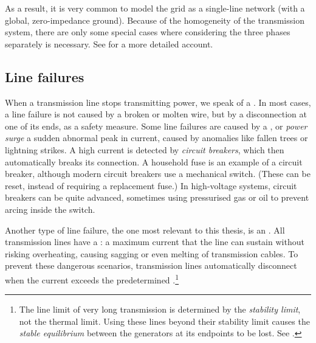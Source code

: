 \documentclass[main.tex]{subfiles}
\begin{document}
As a result, it is very common to model the grid as a single-line network (with a global, zero-impedance ground). Because of the homogeneity of the transmission system, there are only some special cases where considering the three phases separately is necessary. See \cite{Kirtley2010} for a more detailed account.

\subsection{Line failures}\label{sec:linefailures}
When a transmission line stops transmitting power, we speak of a . In most cases, a line failure is not caused by a broken or molten wire, but by a disconnection at one of its ends, as a safety measure. 
Some line failures are caused by a , or \emph{power surge} a sudden abnormal peak in current, caused by anomalies like fallen trees or lightning strikes. A high current is detected by \emph{circuit breakers}, which then automatically breaks its connection. A household fuse is an example of a circuit breaker, although modern circuit breakers use a mechanical switch. (These can be reset, instead of requiring a replacement fuse.) In high-voltage systems, circuit breakers can be quite advanced, sometimes using pressurised gas or oil to prevent arcing inside the switch.

Another type of line failure, the one most relevant to this thesis, is an . All transmission lines have a : a maximum current that the line can sustain without risking overheating, causing sagging or even melting of transmission cables. To prevent these dangerous scenarios, transmission lines automatically disconnect when the current exceeds the predetermined .\footnote{The line limit of very long transmission is determined by the \emph{stability limit}, not the thermal limit. Using these lines beyond their stability limit causes the \emph{stable equilibrium} between the generators at its endpoints to be lost. See \cite{VonMeier2006}.}
\end{document}
